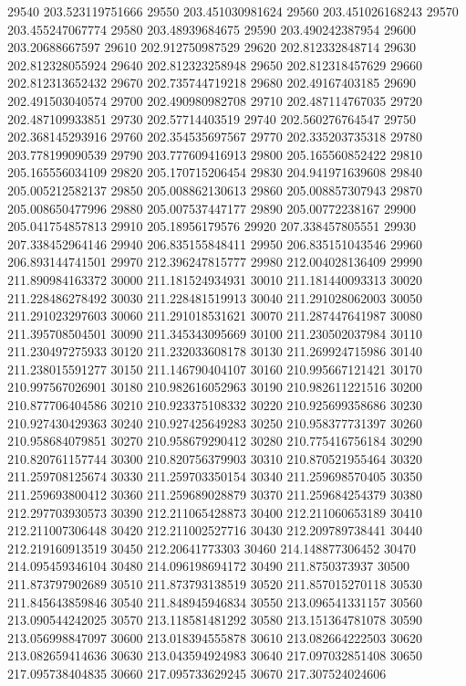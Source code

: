 {29540 203.523119751666
29550 203.451030981624
29560 203.451026168243
29570 203.455247067774
29580 203.48939684675
29590 203.490242387954
29600 203.20688667597
29610 202.912750987529
29620 202.812332848714
29630 202.812328055924
29640 202.812323258948
29650 202.812318457629
29660 202.812313652432
29670 202.735744719218
29680 202.49167403185
29690 202.491503040574
29700 202.490980982708
29710 202.487114767035
29720 202.487109933851
29730 202.57714403519
29740 202.560276764547
29750 202.368145293916
29760 202.354535697567
29770 202.335203735318
29780 203.778199090539
29790 203.777609416913
29800 205.165560852422
29810 205.165556034109
29820 205.170715206454
29830 204.941971639608
29840 205.005212582137
29850 205.008862130613
29860 205.008857307943
29870 205.008650477996
29880 205.007537447177
29890 205.00772238167
29900 205.041754857813
29910 205.18956179576
29920 207.338457805551
29930 207.338452964146
29940 206.835155848411
29950 206.835151043546
29960 206.893144741501
29970 212.396247815777
29980 212.004028136409
29990 211.890984163372
30000 211.181524934931
30010 211.181440093313
30020 211.228486278492
30030 211.228481519913
30040 211.291028062003
30050 211.291023297603
30060 211.291018531621
30070 211.287447641987
30080 211.395708504501
30090 211.345343095669
30100 211.230502037984
30110 211.230497275933
30120 211.232033608178
30130 211.269924715986
30140 211.238015591277
30150 211.146790404107
30160 210.995667121421
30170 210.997567026901
30180 210.982616052963
30190 210.982611221516
30200 210.877706404586
30210 210.923375108332
30220 210.925699358686
30230 210.927430429363
30240 210.927425649283
30250 210.958377731397
30260 210.958684079851
30270 210.958679290412
30280 210.775416756184
30290 210.820761157744
30300 210.820756379903
30310 210.870521955464
30320 211.259708125674
30330 211.259703350154
30340 211.259698570405
30350 211.259693800412
30360 211.259689028879
30370 211.259684254379
30380 212.297703930573
30390 212.211065428873
30400 212.211060653189
30410 212.211007306448
30420 212.211002527716
30430 212.209789738441
30440 212.219160913519
30450 212.20641773303
30460 214.148877306452
30470 214.095459346104
30480 214.096198694172
30490 211.8750373937
30500 211.873797902689
30510 211.873793138519
30520 211.857015270118
30530 211.845643859846
30540 211.848945946834
30550 213.096541331157
30560 213.090544242025
30570 213.118581481292
30580 213.151364781078
30590 213.056998847097
30600 213.018394555878
30610 213.082664222503
30620 213.082659414636
30630 213.043594924983
30640 217.097032851408
30650 217.095738404835
30660 217.095733629245
30670 217.307524024606
}
